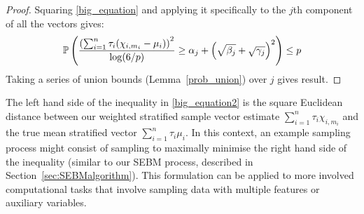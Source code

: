 \begin{theorem}

\end{theorem}
\begin{proof}
Squaring \eqref{big_equation} and applying it specifically to the $j$th component of all the vectors gives:
\begin{equation*}
\operatorname{\mathbb{P}}\left(\frac{\left(\sum_{i=1}^n\tau_i(\chi_{i,m_i}-\mu_i)\right)^2}{\log(6/p)} 
\ge \alpha_{j} 
+ \left(\sqrt{\beta_{j}} 
+ \sqrt{\gamma_{j}}\right)^2  \right)
\le p 
\end{equation*}
Taking a series of union bounds (Lemma~\ref{prob_union}) over $j$ gives result.
\end{proof}

The left hand side of the inequality in \eqref{big_equation2} is the square Euclidean distance between our weighted stratified sample vector estimate $\sum_{i=1}^n\tau_i\chi_{i,m_i}$ and the true mean stratified vector $\sum_{i=1}^n\tau_i\mu_{i}$.
In this context, an example sampling process might consist of sampling to maximally minimise the right hand side of the inequality (similar to our SEBM process, described in Section~\ref{sec:SEBMalgorithm}).
This formulation can be applied to more involved computational tasks that involve sampling data with multiple features or auxiliary variables.


